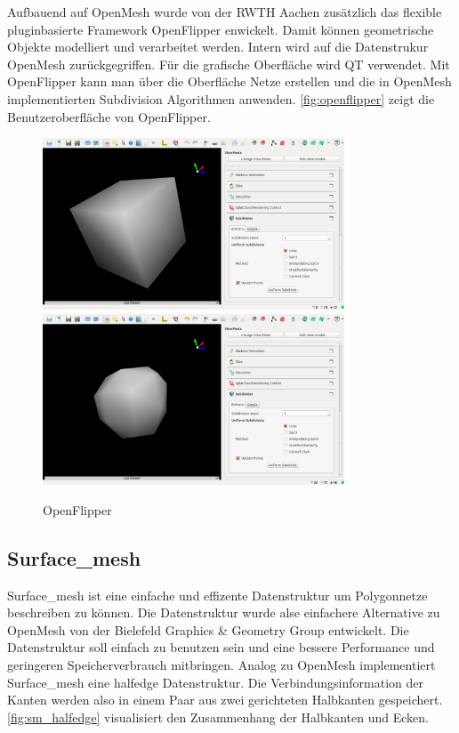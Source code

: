 Aufbauend auf OpenMesh wurde von der \acs{RWTH} Aachen zusätzlich das flexible pluginbasierte Framework OpenFlipper enwickelt.
Damit können geometrische Objekte modelliert und verarbeitet werden. Intern wird auf die Datenstrukur OpenMesh zurückgegriffen.
Für die grafische Oberfläche wird QT verwendet.
Mit OpenFlipper kann man über die Oberfläche Netze erstellen und die in OpenMesh implementierten Subdivision Algorithmen anwenden.
\autoref{fig:openflipper} zeigt die Benutzeroberfläche von OpenFlipper.
\begin{figure}
  \caption{OpenFlipper}
  \centering
  \includegraphics[width=0.8\textwidth]{content/media/openflipper_cube}
  \includegraphics[width=0.8\textwidth]{content/media/openflipper_loop}
  \label{fig:openflipper}
\end{figure}


\subsection{Surface\_mesh}

Surface\_mesh ist eine einfache und effizente Datenstruktur um Polygonnetze beschreiben zu können.
Die Datenstruktur wurde alse einfachere Alternative zu OpenMesh von der Bielefeld Graphics \& Geometry Group entwickelt.
Die Datenstruktur soll einfach zu benutzen sein und eine bessere Performance und geringeren Speicherverbrauch mitbringen.
Analog zu OpenMesh implementiert Surface\_mesh eine halfedge Datenstruktur.
Die Verbindungsinformation der Kanten werden also in einem Paar aus zwei gerichteten Halbkanten gespeichert.
\autoref{fig:sm_halfedge} visualisiert den Zusammenhang der Halbkanten und Ecken.

